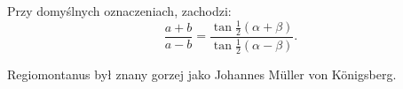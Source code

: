 \begin{proposition}
%
    Przy domyślnych oznaczeniach, zachodzi:
    \begin{equation}
        \frac{a + b}{a- b} = \frac{\tan \frac 1 2 (\alpha + \beta)}{\tan \frac 1 2 (\alpha - \beta)}.
    \end{equation}
\end{proposition}

Regiomontanus był znany gorzej jako Johannes Müller von Königsberg.
